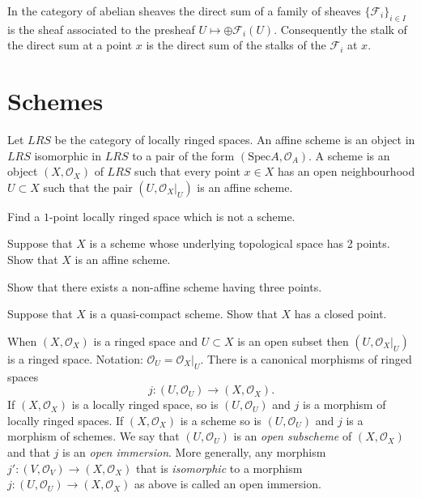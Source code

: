 \begin{remark}
In the category of abelian sheaves the direct sum of
a family of sheaves $\{{\mathcal F}_i\}_{i\in I}$ is the sheaf associated to
the presheaf $U \mapsto \oplus {\mathcal F}_i(U)$. Consequently the stalk of
the direct sum at a point $x$ is the direct sum of the stalks of the 
${\mathcal F}_i$ at $x$.
\end{remark}

\section{Schemes}
\label{section-schemes}

\noindent
Let $LRS$ be the category of locally ringed spaces.
An affine scheme is an object in $LRS$ isomorphic in $LRS$ to
a pair of the form $(\text{Spec} A, {\mathcal O}_A)$. A scheme is an
object $(X, {\mathcal O}_X)$ of $LRS$ such that every point $x\in X$ 
has an open neighbourhood $U \subset X$ such that the pair
$(U, {\mathcal O}_X|_U)$ is an affine scheme.

\begin{exercise}
\label{exercise-one-point}
Find a $1$-point locally ringed space which is not a scheme.
\end{exercise}

\begin{exercise}
\label{exercise-two-points}
Suppose that $X$ is a scheme whose underlying 
topological space has 2 points. Show that $X$ is an affine scheme.
\end{exercise}

\begin{exercise}
\label{exercise-three-points}
Show that there exists a non-affine scheme having three points.
\end{exercise}

\begin{exercise}
\label{exercise-quasi-compact-closed-point}
Suppose that $X$ is a quasi-compact scheme.
Show that $X$ has a closed point.
\end{exercise}

\begin{remark}
When $(X, {\mathcal O}_X)$ is a ringed space and $U \subset X$
is an open subset then $(U, {\mathcal O}_X|_U)$ is a ringed space. Notation:
${\mathcal O}_U = {\mathcal O}_X|_U$. There is a canonical morphisms
of ringed spaces
$$
	j : (U, {\mathcal O}_U) \longrightarrow (X, {\mathcal O}_X).
$$
If $(X, {\mathcal O}_X)$ is a locally ringed space, so is
$(U, {\mathcal O}_U)$ and
$j$ is a morphism of locally ringed spaces. If $(X, {\mathcal O}_X)$
is a scheme
so is $(U, {\mathcal O}_U)$ and $j$ is a morphism of schemes. We say
that
$(U, {\mathcal O}_U)$ is an {\it open subscheme} of $(X, {\mathcal O}_X)$
and that
$j$ is an {\it open immersion}. More generally, any morphism
$j' : (V, {\mathcal O}_V) \to (X, {\mathcal O}_X)$ that is {\it isomorphic}
to a
morphism $j : (U, {\mathcal O}_U) \to (X, {\mathcal O}_X)$ as above is
called an
open immersion.
\end{remark}

